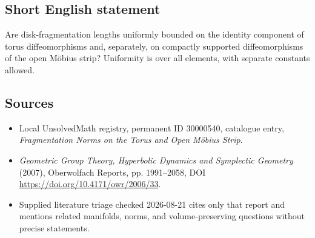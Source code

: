 \documentclass[11pt]{article}
\begin{document}
\subsection{Short English statement}
Are disk-fragmentation lengths uniformly bounded on the identity component of torus diffeomorphisms and, separately, on compactly supported diffeomorphisms of the open M\"obius strip? Uniformity is over all elements, with separate constants allowed.
\subsection{Sources}
\begin{itemize}
\item Local UnsolvedMath registry, permanent ID 30000540, catalogue entry, \emph{Fragmentation Norms on the Torus and Open M\"obius Strip}.
\item \emph{Geometric Group Theory, Hyperbolic Dynamics and Symplectic Geometry} (2007), Oberwolfach Reports, pp. 1991--2058, DOI \url{https://doi.org/10.4171/owr/2006/33}.
\item Supplied literature triage checked 2026-08-21 cites only that report and mentions related manifolds, norms, and volume-preserving questions without precise statements.
\end{itemize}
\end{document}
